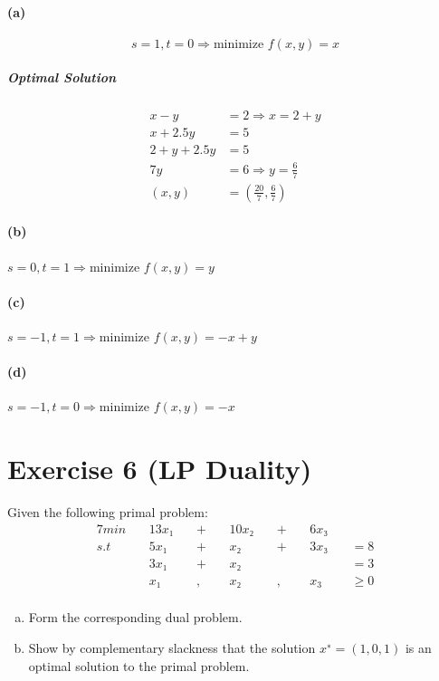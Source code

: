 \documentclass[a4paper, 12pt]{report}
\begin{document}
\paragraph{(a)}
\[
    s=1, t=0 ⇒ \text{minimize } f(x,y) = x
\]

\subparagraph{Optimal Solution}
\begin{align*}
    x-y      &= 2 ⇒ x=2+y\\
    x+2.5y   &= 5\\
    2+y+2.5y &= 5\\
    7y       &= 6 ⇒ y = \frac{6}{7}\\
    (x,y)    &= (\frac{20}{7}, \frac{6}{7})
\end{align*}

\paragraph{(b)} $s=0, t=1 ⇒ \text{minimize } f(x,y) = y$

\paragraph{(c)} $s=-1, t=1 ⇒ \text{minimize } f(x,y) = -x+y$

\paragraph{(d)} $s=-1, t=0 ⇒ \text{minimize } f(x,y) = -x$

\section{Exercise 6 (LP Duality)}

Given the following primal problem:
\begin{alignat*}{7}
    min ~&& 13x₁ ~&& + ~&& 10x₂ ~&& + ~&& 6x₃ ~&&  \\
    s.t ~&& 5x₁  ~&& + ~&& x₂   ~&& + ~&& 3x₃ ~&&  = 8\\
        ~&& 3x₁  ~&& + ~&& x₂   ~&&   ~&&     ~&&  = 3\\
        ~&& x₁   ~&& , ~&& x₂   ~&& , ~&& x_3 ~&&  ≥0\\
\end{alignat*}
\begin{enumerate}[(a)]
    \item Form the corresponding dual problem.
    \item Show by complementary slackness that the solution $x^∗ = (1, 0, 1)$
          is an optimal solution to the primal problem.
\end{enumerate}
\end{document}

